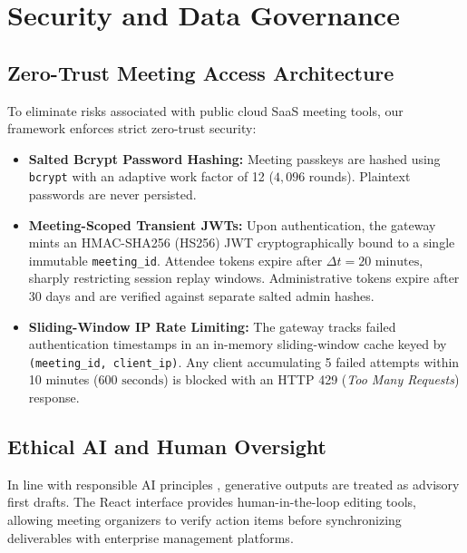 \documentclass[conference]{IEEEtran}
\begin{document}
\section{Security and Data Governance}
\label{sec:security_ethics}

\subsection{Zero-Trust Meeting Access Architecture}
To eliminate risks associated with public cloud SaaS meeting tools, our framework enforces strict zero-trust security:
\begin{itemize}
    \item \textbf{Salted Bcrypt Password Hashing:} Meeting passkeys are hashed using \texttt{bcrypt} with an adaptive work factor of 12 ($4,096$ rounds). Plaintext passwords are never persisted.
    \item \textbf{Meeting-Scoped Transient JWTs:} Upon authentication, the gateway mints an HMAC-SHA256 (HS256) JWT cryptographically bound to a single immutable \texttt{meeting\_id}. Attendee tokens expire after $\Delta t = 20\text{ minutes}$, sharply restricting session replay windows. Administrative tokens expire after 30 days and are verified against separate salted admin hashes.
    \item \textbf{Sliding-Window IP Rate Limiting:} The gateway tracks failed authentication timestamps in an in-memory sliding-window cache keyed by \texttt{(meeting\_id, client\_ip)}. Any client accumulating 5 failed attempts within 10 minutes ($600\text{ seconds}$) is blocked with an HTTP 429 (\textit{Too Many Requests}) response.
\end{itemize}

\subsection{Ethical AI and Human Oversight}
In line with responsible AI principles \cite{mane2026edugen, mane2026deepfake, kharkate2026skin}, generative outputs are treated as advisory first drafts. The React interface provides human-in-the-loop editing tools, allowing meeting organizers to verify action items before synchronizing deliverables with enterprise management platforms.

\end{document}
